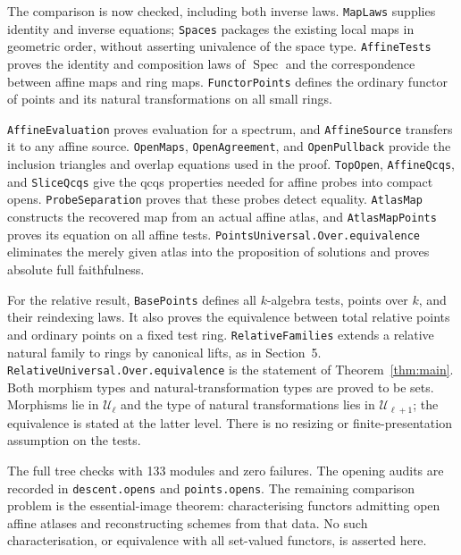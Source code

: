 \documentclass[11pt]{amsart}
\theoremstyle{remark}\newtheorem{remark}[theorem]{Remark}
\newcommand{\Spec}{\operatorname{Spec}}
\newcommand{\UU}{\mathcal U}
\begin{document}
The comparison is now checked, including both inverse laws.
\texttt{MapLaws} supplies identity and inverse equations;
\texttt{Spaces} packages the existing local maps in geometric order,
without asserting univalence of the space type.
\texttt{AffineTests} proves the identity and composition laws of
$\Spec$ and the correspondence between affine maps and ring maps.
\texttt{FunctorPoints} defines the ordinary functor of points and its
natural transformations on all small rings.

\texttt{AffineEvaluation} proves evaluation for a spectrum, and
\texttt{AffineSource} transfers it to any affine source.
\texttt{OpenMaps}, \texttt{OpenAgreement}, and \texttt{OpenPullback}
provide the inclusion triangles and overlap equations used in the proof.
\texttt{TopOpen}, \texttt{AffineQcqs}, and \texttt{SliceQcqs}
give the qcqs properties needed for affine probes into compact opens.
\texttt{ProbeSeparation} proves that these probes detect equality.
\texttt{AtlasMap} constructs the recovered map from an actual affine
atlas, and \texttt{AtlasMapPoints} proves its equation on all affine tests.
\texttt{PointsUniversal.Over.equivalence} eliminates the merely given
atlas into the proposition of solutions and proves absolute full faithfulness.

For the relative result, \texttt{BasePoints} defines all $k$-algebra
tests, points over $k$, and their reindexing laws. It also proves the
equivalence between total relative points and ordinary points on a fixed
test ring. \texttt{RelativeFamilies} extends a relative natural family
to rings by canonical lifts, as in Section~5.
\texttt{RelativeUniversal.Over.equivalence} is the statement of
Theorem~\ref{thm:main}. Both morphism types and natural-transformation
types are proved to be sets. Morphisms lie in $\UU_\ell$ and the type of
natural transformations lies in $\UU_{\ell+1}$; the equivalence is stated
at the latter level. There is no resizing or finite-presentation
assumption on the tests.

The full tree checks with 133 modules and zero failures. The opening
audits are recorded in \texttt{descent.opens} and \texttt{points.opens}.
The remaining comparison problem is the essential-image theorem:
characterising functors admitting open affine atlases and reconstructing
schemes from that data. No such characterisation, or equivalence with
all set-valued functors, is asserted here.
\end{document}
